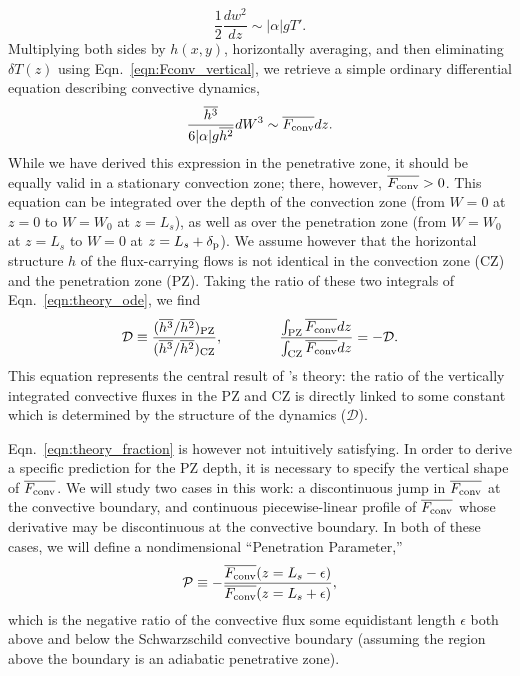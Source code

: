 \documentclass{aastex631}
\newcommand{\delp}{\ensuremath{\delta_{\rm{p}}}}
\newcommand{\Fconv}{\ensuremath{F_{\rm{conv}}}}
\newcommand{\mP}{\ensuremath{\mathcal{P}}}
\newcommand{\mD}{\ensuremath{\mathcal{D}}}
\begin{document}
\begin{equation}
\frac{1}{2}\frac{d w^2}{dz} \sim |\alpha| g T'.
\end{equation}
Multiplying both sides by $h(x,y)$, horizontally averaging, and then eliminating $\delta T(z)$ using Eqn.~\ref{eqn:Fconv_vertical}, we retrieve a simple ordinary differential equation describing convective dynamics,
\begin{equation}
\frac{\overline{h^3}}{6 |\alpha| g \overline{h^2}} dW^3 \sim \overline{\Fconv} dz.
\label{eqn:theory_ode}
\end{equation}
While we have derived this expression in the penetrative zone, it should be equally valid in a stationary convection zone; there, however, $\overline{\Fconv} > 0$.
This equation can be integrated over the depth of the convection zone (from $W = 0$ at $z = 0$ to $W = W_0$ at $z = L_s$), as well as over the penetration zone (from $W = W_0$ at $z = L_s$ to $W = 0$ at $z = L_s + \delp$).
We assume however that the horizontal structure $h$ of the flux-carrying flows is not identical in the convection zone (CZ) and the penetration zone (PZ).
Taking the ratio of these two integrals of Eqn.~\ref{eqn:theory_ode}, we find
\begin{equation}
\mD \equiv \frac{(\overline{h^3}/\overline{h^2})_{\rm{PZ}}}{(\overline{h^3}/\overline{h^2})_{\rm{CZ}}},\qquad\qquad
\frac{\int_{\rm{PZ}} \overline{\Fconv} dz}{\int_{\rm{CZ}} \overline{\Fconv} dz} = - \mD.
\label{eqn:theory_fraction}
\end{equation}
This equation represents the central result of \citet{zahn1991}'s theory: the ratio of the vertically integrated convective fluxes in the PZ and CZ is directly linked to some constant which is determined by the structure of the dynamics ($\mD$).

Eqn.~\ref{eqn:theory_fraction} is however not intuitively satisfying.
In order to derive a specific prediction for the PZ depth, it is necessary to specify the vertical shape of $\overline{\Fconv}$.
We will study two cases in this work: a discontinuous jump in $\overline{\Fconv}$ at the convective boundary, and continuous piecewise-linear profile of $\overline{\Fconv}$ whose derivative may be discontinuous at the convective boundary.
In both of these cases, we will define a nondimensional ``Penetration Parameter,''
\begin{equation}
\mP \equiv -\frac{\overline{\Fconv}(z = L_s - \epsilon)}{\overline{\Fconv}(z = L_s + \epsilon)},
\label{eqn:theory_P_defn}
\end{equation}
which is the negative ratio of the convective flux some equidistant length $\epsilon$ both above and below the Schwarzschild convective boundary (assuming the region above the boundary is an adiabatic penetrative zone).
\end{document}
